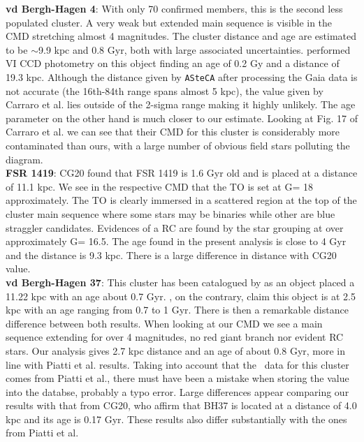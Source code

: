 \documentclass[draft]{aa}
\begin{document}
  \textbf{vd Bergh-Hagen 4}: With only 70 confirmed members, this is the
  second less populated cluster. A very weak but extended main sequence is
  visible in the CMD stretching almost 4 magnitudes.
  The cluster distance and age are estimated to be $\sim$9.9 kpc and 0.8 Gyr,
  both with large associated uncertainties.
  \cite{Carraro_2007} performed VI CCD photometry on this object finding an
  age of 0.2 Gy and a distance of 19.3 kpc. Although the distance given by
  \texttt{ASteCA} after processing the Gaia data is not accurate (the 16th-84th
  range spans almost 5 kpc), the value given by Carraro et al. lies outside
  of the 2-sigma range making it highly unlikely. The age parameter on the other
  hand is much closer to our estimate.
  Looking at Fig. 17 of Carraro et al. we can see that their CMD for this
  cluster is considerably more contaminated than ours, with a large number of
  obvious field stars polluting the diagram.\\

  \textbf{FSR 1419}: CG20 found that FSR 1419 is 1.6 Gyr old and is placed at a
  distance of 11.1 kpc. We see in the respective CMD that the TO is set at G= 18
  approximately. The TO is clearly immersed in a scattered region at the top of
  the cluster main sequence where some stars may be binaries while other are
  blue straggler candidates. Evidences of a RC are found by the star grouping at
  over approximately G= 16.5. The age found in the present analysis is close to 4
  Gyr and the distance is 9.3 kpc. There is a large difference in distance
  with CG20 value. \\  

  \textbf{vd Bergh-Hagen 37}: This cluster has been catalogued by \cite{Dias_2002}
  as an object placed a 11.22 kpc with an age about 0.7 Gyr. \cite{Piatti_2010},
  on the contrary, claim this object is at 2.5 kpc with an age ranging from 0.7 to
  1 Gyr. There is then a remarkable distance difference between both results. When
  looking at our CMD we see a main sequence extending for over 4 magnitudes, no red
  giant branch nor evident RC stars. Our analysis gives 2.7 kpc distance and 
  an age of about 0.8 Gyr, more in line with Piatti et al. results. Taking into account
  that the~\cite{Dias_2002} data for this cluster comes from Piatti et al.,
  there must have been a mistake when storing the value into the databse, probably a
  typo error. Large differences appear comparing our results with that from CG20, who
  affirm that BH37 is located at a distance of 4.0 kpc and its age is 0.17 Gyr. These
  results also differ substantially with the ones from Piatti et al. \\
\end{document}

